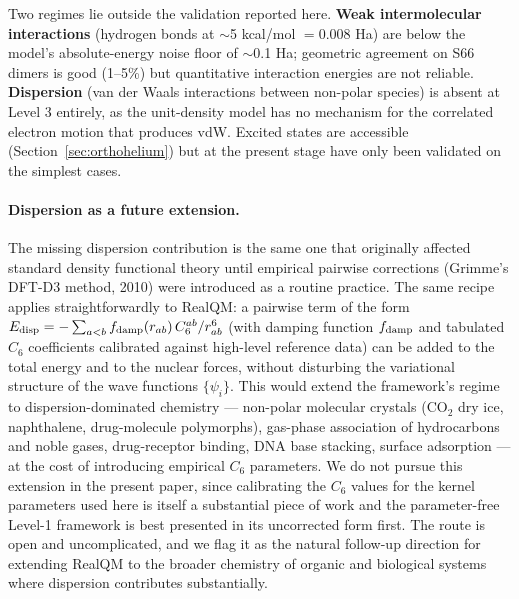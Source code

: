 \documentclass[11pt]{article}
\begin{document}
Two regimes lie outside the validation reported here. \textbf{Weak intermolecular interactions} (hydrogen bonds at $\sim$5 kcal/mol $= 0.008$ Ha) are below the model's absolute-energy noise floor of $\sim$0.1 Ha; geometric agreement on S66 dimers is good (1--5\%) but quantitative interaction energies are not reliable. \textbf{Dispersion} (van der Waals interactions between non-polar species) is absent at Level 3 entirely, as the unit-density model has no mechanism for the correlated electron motion that produces vdW. Excited states are accessible (Section~\ref{sec:orthohelium}) but at the present stage have only been validated on the simplest cases.

\paragraph{Dispersion as a future extension.}
The missing dispersion contribution is the same one that originally affected standard density functional theory until empirical pairwise corrections (Grimme's DFT-D3 method, 2010) were introduced as a routine practice. The same recipe applies straightforwardly to RealQM: a pairwise term of the form $E_{\rm disp} = -\sum_{a<b} f_{\rm damp}(r_{ab})\, C_6^{ab}/r_{ab}^6$ (with damping function $f_{\rm damp}$ and tabulated $C_6$ coefficients calibrated against high-level reference data) can be added to the total energy and to the nuclear forces, without disturbing the variational structure of the wave functions $\{\psi_i\}$. This would extend the framework's regime to dispersion-dominated chemistry --- non-polar molecular crystals (CO$_2$ dry ice, naphthalene, drug-molecule polymorphs), gas-phase association of hydrocarbons and noble gases, drug-receptor binding, DNA base stacking, surface adsorption --- at the cost of introducing empirical $C_6$ parameters. We do not pursue this extension in the present paper, since calibrating the $C_6$ values for the kernel parameters used here is itself a substantial piece of work and the parameter-free Level-1 framework is best presented in its uncorrected form first. The route is open and uncomplicated, and we flag it as the natural follow-up direction for extending RealQM to the broader chemistry of organic and biological systems where dispersion contributes substantially.
\end{document}
